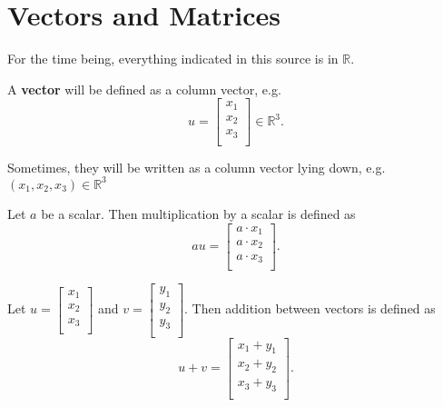 
\section{Vectors and Matrices}

For the time being, everything indicated in this source is in \( \mathbb{R} \).

\begin{definition}
	A \textbf{vector} will be defined as a column vector, e.g. \[
		u=\begin{bmatrix}
			x_{1} \\
			x_{2} \\
			x_{3} \\
		\end{bmatrix}
		\in \mathbb{R}^3
	.\] 
\end{definition}

\begin{notation}
	Sometimes, they will be written as a column vector lying down, e.g. \( (x_{1},x_{2},x_{3}) \in \mathbb{R}^3 \)
\end{notation}

\begin{definition}
	Let \( a \) be a scalar. Then multiplication by a scalar is defined as \[
		au = \begin{bmatrix}
			a\cdot x_{1}\\
			a\cdot x_{2}\\
			a\cdot x_{3}\\
		\end{bmatrix}
	.\] 
\end{definition}

\begin{definition}
	Let \(u = \begin{bmatrix}
			x_{1}\\
			x_{2}\\
			x_{3}\\
		\end{bmatrix} \) and \( v = \begin{bmatrix}
			y_{1}\\
			y_{2}\\
			y_{3}\\
		\end{bmatrix}
	\). Then addition between vectors is defined as \[
		u+v = \begin{bmatrix}
			x_{1}+y_{1}\\
			x_{2}+y_{2}\\
			x_{3}+y_{3}\\
		\end{bmatrix}
	.\] 
\end{definition}

